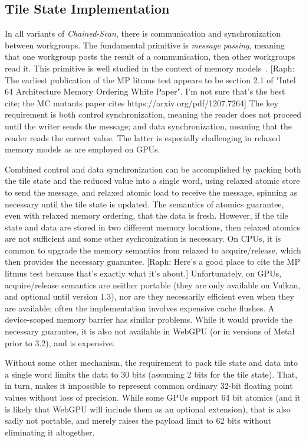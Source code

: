 \documentclass[sigconf]{acmart}
\newcommand{\raph}[1]{{\footnotesize\color{magenta}[Raph: #1]}}
\begin{document}
\subsection{Tile State Implementation}
In all variants of \emph{Chained-Scan}, there is communication and synchronization between workgroups. The fundamental primitive is \emph{message passing,} meaning that one workgroup posts the result of a communication, then other workgroups read it. This primitive is well studied in the context of memory models~\cite{}. \raph{The earliest publication of the MP litmus test appears to be section 2.1 of "Intel 64 Architecture Memory Ordering White Paper". I'm not sure that's the best cite; the MC mutants paper cites https://arxiv.org/pdf/1207.7264} The key requirement is both control synchronization, meaning the reader does not proceed until the writer sends the message; and data synchronization, meaning that the reader reads the correct value. The latter is especially challenging in relaxed memory models as are employed on GPUs.

Combined control and data synchronization can be accomplished by packing both the tile state and the reduced value into a single word, using relaxed atomic store to send the message, and relaxed atomic load to receive the message, spinning as necessary until the tile state is updated. The semantics of atomics guarantee, even with relaxed memory ordering, that the data is fresh. However, if the tile state and data are stored in two different memory locations, then relaxed atomics are not sufficient and some other sychronization is necessary. On CPUs, it is common to upgrade the memory semantics from relaxed to acquire/release, which then provides the necessary guarantee. \raph{Here's a good place to cite the MP litmus test because that's exactly what it's about.} Unfortunately, on GPUs, acquire/release semantics are neither portable (they are only available on Vulkan, and optional until version 1.3), nor are they necessarily efficient even when they are available; often the implementation involves expensive cache flushes. A device-scoped memory barrier has similar problems. While it would provide the necessary guarantee, it is also not available in WebGPU (or in versions of Metal prior to 3.2), and is expensive.

Without some other mechanism, the requirement to pack tile state and data into a single word limits the data to 30 bits (assuming 2 bits for the tile state). That, in turn, makes it impossible to represent common ordinary 32-bit floating point values without loss of precision. While some GPUs support 64 bit atomics (and it is likely that WebGPU will include them as an optional extension), that is also sadly not portable, and merely raises the payload limit to 62 bits without eliminating it altogether.
\end{document}
